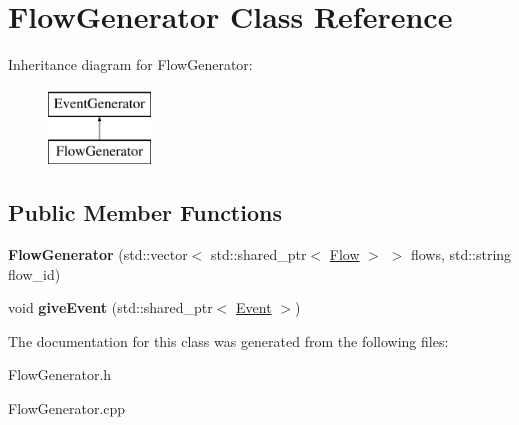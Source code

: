 \hypertarget{classFlowGenerator}{\section{\-Flow\-Generator \-Class \-Reference}
\label{classFlowGenerator}
}
\-Inheritance diagram for \-Flow\-Generator\-:\begin{figure}[H]
\begin{center}
\leavevmode
\includegraphics[height=2.000000cm]{classFlowGenerator}
\end{center}
\end{figure}
\subsection*{\-Public \-Member \-Functions}
\begin{DoxyCompactItemize}
\item 
\hypertarget{classFlowGenerator_ae51c2e304770a911f9cc1d8e0d01310c}{{\bfseries \-Flow\-Generator} (std\-::vector$<$ std\-::shared\-\_\-ptr$<$ \hyperlink{classFlow}{\-Flow} $>$ $>$ flows, std\-::string flow\-\_\-id)}\label{classFlowGenerator_ae51c2e304770a911f9cc1d8e0d01310c}

\item 
\hypertarget{classFlowGenerator_a5c4ac4997c37c524a7c1c8ab264eb882}{void {\bfseries give\-Event} (std\-::shared\-\_\-ptr$<$ \hyperlink{classEvent}{\-Event} $>$)}\label{classFlowGenerator_a5c4ac4997c37c524a7c1c8ab264eb882}

\end{DoxyCompactItemize}


\-The documentation for this class was generated from the following files\-:\begin{DoxyCompactItemize}
\item 
\-Flow\-Generator.\-h\item 
\-Flow\-Generator.\-cpp\end{DoxyCompactItemize}
